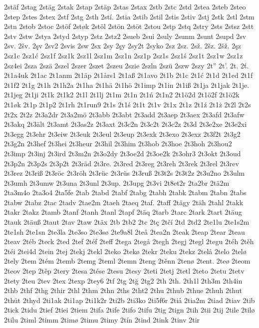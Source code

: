 2stäf
2stag
2stäg
2stak
2stap
2stäp
2stas
2stax
2stb
2stc
2std
2stea
2steb
2steo
2step
2stes
2stex
2stf
2stg
2sth
2stí.
2stia
2stib
2stil
2stis
2stiv
2stj
2stk
2stl
2stm
2stn
2stob
2stoc
2stöf
2støk
2stöl
2stön
2stöt
2stou
2stp
2stq
2stry
2sts
2stsz
2stt
2stv
2stw
2stya
2styd
2styp
2stz
2stz2
2sueb
2sui
2suly
2sunm
2sunt
2supd
2sv
2sv.
2šv.
2şv
2sv2
2svis
2sw
2sx
2sy
2şy
2sy2t
2syko
2sz
2sz.
2sž.
2šz.
2šž.
2şz
2sz1c
2sz1ć
2sz1f
2sz1k
2sz1l
2sz1m
2sz1n
2sz1p
2sz1s
2sz1ś
2sz1t
2sz1w
2sz1z
2sz4ei
2sza
2szä
2szel
2szer
2szet
2szeu
2szie
2szln
2szü
2szw
2szy
2t''
2t'.
2t.
2ť.
2t1a4uk
2t1ac
2t1anm
2t1äp
2t1års1
2t1aß
2t1avo
2t1b
2t1c
2t1ć
2t1d
2t1ed
2t1f
2t1f2
2t1g
2t1h
2t1h2a
2t1ha
2t1hä
2t1hö
2t1imp
2t1in
2t1iß
2t1ja
2t1jak
2t1je.
2t1jeg
2t1ji
2t1k
2t1k2
2t1l
2t1lj
2t1m
2t1n
2t1ń
2t1n2
2t1ö2d
2t1ö2f
2t1ö2k
2t1øk
2t1p
2t1p2
2t1rh
2t1run9
2t1s
2t1ś
2t1t
2t1v
2t1x
2t1z
2t1ź
2t1ż
2t2l
2t2s
2t2x
2t2z
2t3a2dr
2t3a2mö
2t3abb
2t3abt
2t3add
2t3aep
2t3aex
2t3afd
2t3afw
2t3akq
2t3ält
2t3amt
2t3as2z
2t3axt
2t3c2n
2t3c2t
2t3c2z
2t3d
2t3e2xe
2t3e2xi
2t3egg
2t3ehr
2t3eiw
2t3euk
2t3eul
2t3eup
2t3exk
2t3exo
2t3exz
2t3f2t
2t3g2
2t3g2n
2t3hef
2t3hei
2t3heur
2t3hil
2t3him
2t3hob
2t3hoe
2t3hoh
2t3hou2
2t3imp
2t3inj
2t3ird
2t3m2n
2t3o2dy
2t3oe2d
2t3oe2k
2t3ohr3
2t3okt
2t3oud
2t3p2n
2t3p2s
2t3p2t
2t3räd
2t3re.
2t3red
2t3reg
2t3reh
2t3rek
2t3rel
2t3rev
2t3rez
2t3riß
2t3röc
2t3röh
2t3rüc
2t3rüs
2t3ruß
2t3t2s
2t3t2z
2t3u2no
2t3ulm
2t3umh
2t3umw
2t3una
2t3unl
2t3up.
2t3upg
2t3vi
2t8et2r
2ta2br
2tä2m
2ta3m4o
2ta3o4
2ta5fe
2tab
2tabd
2tabf
2tabg
2tabh
2tabk
2tabm
2tabn
2tabs
2tabw
2tabz
2tac
2tadv
2tae2m
2taeh
2taeq
2taf.
2taff
2tägy
2täh
2tahl
2takk
2takr
2takz
2tamb
2tanf
2tanh
2tanl
2tapf
2täq
2tarb
2tarc
2tark
2tart
2täug
2tauk
2täuß
2taut
2tav
2taw
2täx
2tb
2tb2
2tc
2tç
2tčí
2td
2td2
2te1lu
2te1s2m
2te1sh
2te1sn
2te3la
2te3so
2te3sø
2te9a8l
2teå
2tea2n
2teak
2teap
2tear
2teau
2teav
2téb
2teck
2ted
2tef
2téf
2teff
2tega
2tegå
2tegh
2tegj
2tegl
2tegu
2téh
2těh
2téi
2tei4d
2tein
2tej
2tekj
2tekl
2teko
2tekø
2tekr
2teku
2tekz
2telå
2telo
2telø
2tely
2tem
2tém
2temb
2temg
2teml
2temn
2teng
2těnn
2tenø
2tent.
2teø
2teom
2teov
2tep
2těp
2tery
2tesa
2tése
2tesu
2tesy
2teti
2tetj
2tetl
2teto
2tetu
2tetv
2tety
2teu
2tev
2tex
2texp
2tey6
2tf
2tg
2tğ
2tg2
2th
2th.
2th1l
2th3m
2th4in
2thb
2thf
2thg
2thir
2thl
2thm
2thn
2ths
2tht2
2thu
2thub
2thue
2thuh
2thut
2thüt
2thyd
2ti1ak
2ti1ap
2ti1k2r
2ti2b
2ti3ko
2ti5f6r
2tiå
2tia2m
2tiad
2tiav
2tib
2tick
2tidu
2tief
2tiei
2tiem
2tifa
2tife
2tifo
2tifu
2tig
2tign
2tih
2tii
2tij
2tile
2tilø
2tilu
2timl
2timm
2timø
2timu
2timy
2tín
2tind
2tink
2tinv
2tir
